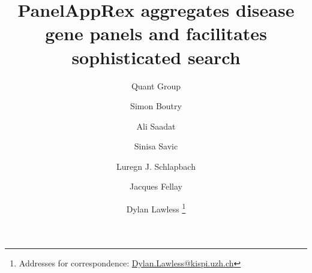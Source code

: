 	
\usepackage[printonlyused,withpage,nohyperlinks]{acronym}
\RequirePackage[normalem]{ulem} %
\RequirePackage{color} %
\providecommand{\DIFadd}[1]{{\protect\color{blue}\uwave{#1}}} %
\providecommand{\DIFdel}[1]{{\protect\color{red}\sout{#1}}} %
\providecommand{\DIFaddbegin}{} %
\providecommand{\DIFaddend}{} %
\providecommand{\DIFdelbegin}{} %
\providecommand{\DIFdelend}{} %
\providecommand{\DIFmodbegin}{} %
\providecommand{\DIFmodend}{} %
\providecommand{\DIFaddFL}[1]{\DIFadd{#1}} %
\providecommand{\DIFdelFL}[1]{\DIFdel{#1}} %
\providecommand{\DIFaddbeginFL}{} %
\providecommand{\DIFaddendFL}{} %
\providecommand{\DIFdelbeginFL}{} %
\providecommand{\DIFdelendFL}{} %
\RequirePackage{listings} %
\RequirePackage{color} %
\lstset{extendedchars=\true,inputencoding=utf8}



\title{PanelAppRex aggregates disease gene panels and facilitates sophisticated search}	

\newcommand{\QUANT}{1}
\newcommand{\GHI}{2}
\newcommand{\LEEDS}{3}
\newcommand{\IPSNEO}{4}

\author[\QUANT]{Quant Group} 
\author[\GHI]{Simon Boutry}%
\author[\GHI]{Ali Saadat}%
\author[\LEEDS]{Sinisa Savic}%
\author[\IPSNEO]{Luregn J. Schlapbach}
\author[\GHI]{Jacques Fellay}
\author[\IPSNEO]{Dylan Lawless \thanks{Addresses for correspondence: \href{mailto:Dylan.Lawless@kispi.uzh.ch}{Dylan.Lawless@kispi.uzh.ch}}
}

